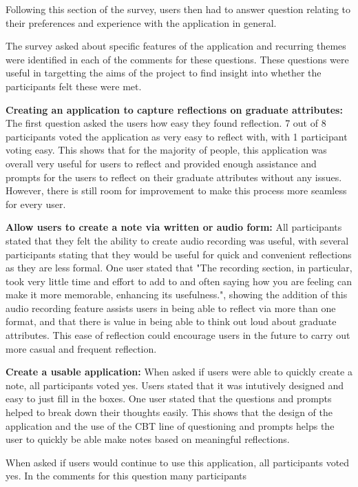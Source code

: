 \documentclass{l4proj}
\begin{document}
\par 
Following this section of the survey, users then had to answer question relating to their preferences and experience with the application
in general. 
\par 
The survey asked about specific features of the application and recurring themes were identified in each of the comments
for these questions. These questions were useful in targetting the aims of the project to find insight into whether the participants 
felt these were met.
\par 
\textbf{Creating an application to capture reflections on graduate attributes:} The first question asked the users how easy they found reflection. 7 out of 8 participants voted the application as very easy 
to reflect with, with 1 participant voting easy. This shows that for the majority of people, this application was overall 
very useful for users to reflect and provided enough assistance and prompts for the users to reflect on their graduate attributes 
without any issues. However, there is still room for improvement to make this process more seamless for every user.
\par 
\textbf{Allow users to create a note via written or audio form:} All participants stated that they felt the ability to create audio 
recording was useful, with several participants stating that they would be useful for quick and convenient reflections as they are 
less formal. One user stated that "The recording section, in particular, took very 
little time and effort to add to and often saying how you are feeling can make it more memorable, enhancing its usefulness.", showing 
the addition of this audio recording feature assists users in being able to reflect via more than one format, and that there is value
in being able to think out loud about graduate attributes. This ease of reflection could encourage users in the future to carry out 
more casual and frequent reflection. 
\par 
\textbf{Create a usable application:} When asked if users were able to quickly create a note, all participants voted yes. Users stated that
it was intutively designed and easy to just fill in the boxes. One user stated that the questions and prompts helped to break down
their thoughts easily. This shows that the design of the application and the use of the CBT line of questioning and prompts helps
the user to quickly be able make notes based on meaningful reflections. 
\par 
When asked if users would continue to use this application, all participants voted yes. In the comments for this question many participants
\end{document}
